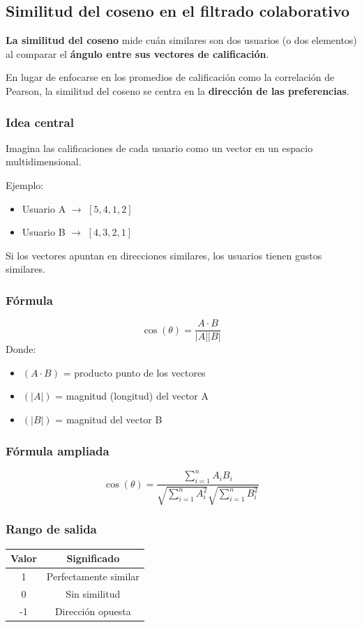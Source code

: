 \documentclass[12pt]{article}
\begin{document}
\subsection{Similitud del coseno en el filtrado colaborativo}
\textbf{La similitud del coseno} mide cuán similares son dos usuarios (o dos elementos) al comparar el \textbf{ángulo entre sus vectores de calificación}.

En lugar de enfocarse en los promedios de calificación como la correlación de Pearson, la similitud del coseno se centra en la \textbf{dirección de las preferencias}.

\subsubsection*{Idea central}
Imagina las calificaciones de cada usuario como un vector en un espacio multidimensional.

Ejemplo:
\begin{itemize}
\item Usuario A $\rightarrow$ $[5,4,1,2]$
\item Usuario B $\rightarrow$ $[4,3,2,1]$
\end{itemize}

Si los vectores apuntan en direcciones similares, los usuarios tienen gustos similares.

\subsubsection*{Fórmula}
\[
\cos(\theta)=\frac{A\cdot B}{|A||B|}
\]
Donde:
\begin{itemize}
\item $(A \cdot B)$ = producto punto de los vectores
\item $(|A|)$ = magnitud (longitud) del vector A
\item $(|B|)$ = magnitud del vector B
\end{itemize}

\subsubsection*{Fórmula ampliada}
\[
\cos(\theta)=\frac{\sum_{i=1}^{n}A_iB_i}{\sqrt{\sum_{i=1}^{n}A_i^2}\sqrt{\sum_{i=1}^{n}B_i^2}}
\]

\subsubsection*{Rango de salida}
\begin{center}
\begin{tabular}{|c|c|}
\hline
Valor & Significado \\
\hline
1 & Perfectamente similar \\
0 & Sin similitud \\
-1 & Dirección opuesta \\
\hline
\end{tabular}
\end{center}
\end{document}
